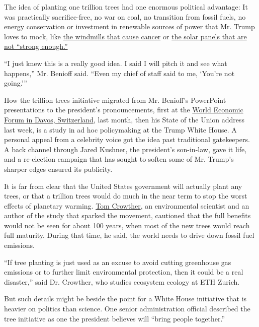 The idea of planting one trillion trees had one enormous political
advantage: It was practically sacrifice-free, no war on coal, no
transition from fossil fuels, no energy conservation or investment in
renewable sources of power that Mr. Trump loves to mock, like
\href{https://www.politifact.com/factchecks/2019/apr/08/donald-trump/republicans-dismiss-trumps-windmill-and-cancer-cla/}{the
windmills that cause cancer} or
\href{https://www.newsweek.com/donald-trump-criticizes-solar-power-windmills-turn-television-1370707}{the
solar panels that are not ``strong enough.''}

``I just knew this is a really good idea. I said I will pitch it and see
what happens,'' Mr. Benioff said. ``Even my chief of staff said to me,
`You're not going.'''

How the trillion trees initiative migrated from Mr. Benioff's PowerPoint
presentations to the president's pronouncements, first at the
\href{https://www.nytimes3xbfgragh.onion/2020/01/21/business/trump-davos.html}{World
Economic Forum in Davos, Switzerland}, last month, then his State of the
Union address last week, is a study in ad hoc policymaking at the Trump
White House. A personal appeal from a celebrity voice got the idea past
traditional gatekeepers. A back channel through Jared Kushner, the
president's son-in-law, gave it life, and a re-election campaign that
has sought to soften some of Mr. Trump's sharper edges ensured its
publicity.

It is far from clear that the United States government will actually
plant any trees, or that a trillion trees would do much in the near term
to stop the worst effects of planetary warming.
\href{https://usys.ethz.ch/en/people/profile.tom-crowther.html}{Tom
Crowther}, an environmental scientist and an author of the study that
sparked the movement, cautioned that the full benefits would not be seen
for about 100 years, when most of the new trees would reach full
maturity. During that time, he said, the world needs to drive down
fossil fuel emissions.

``If tree planting is just used as an excuse to avoid cutting greenhouse
gas emissions or to further limit environmental protection, then it
could be a real disaster,'' said Dr. Crowther, who studies ecosystem
ecology at ETH Zurich.

But such details might be beside the point for a White House initiative
that is heavier on politics than science. One senior administration
official described the tree initiative as one the president believes
will ``bring people together.''

